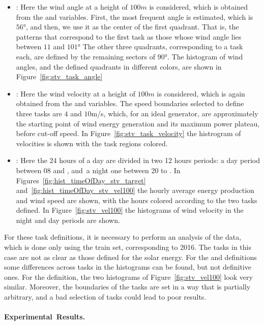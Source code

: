 \begin{itemize}
    \item {}: Here the wind angle at a height of $100m$ is considered, which is obtained from the  and  variables. 
    First, the most frequent angle is estimated, which is $\ang{56}$, and then, we use it as the center of the first quadrant. That is, the patterns that correspond to the first task as those whose wind angle lies between ${11}$ and $\ang{101}$  The other three quadrants, corresponding to a task each, are defined by the remaining sectors of $\ang{90}$.
    The histogram of wind angles, and the defined quadrants in different colors, are shown in Figure~\ref{fig:stv_task_angle}
    \item {}: Here the wind velocity at a height of $100m$ is considered, which is again obtained from the  and  variables. The speed boundaries selected to define three tasks are $4$ and $10$m/s, which, for an ideal generator, are approximately the starting point of wind energy generation and its maximum power plateau, before cut-off speed.   
    In Figure~\ref{fig:stv_task_velocity} the histrogram of velocities is shown with the task regions colored. 
    \item {}: Here the 24 hours of a day are divided in two 12 hours periods: a day period between 08 and , and~a night one between 20 to .
    In Figures~\ref{fig:hist_timeOfDay_stv_target} and~\ref{fig:hist_timeOfDay_stv_vel100} the hourly average energy production and wind speed are shown, with the hours colored according to the two tasks defined. In Figure~\ref{fig:stv_vel100} the histograms of wind velocity in the night and day periods are shown.
\end{itemize}
%
For these task definitions, it is necessary to perform an analysis of the data, which is done only using the train set, corresponding to 2016.
The tasks in this case are not as clear as those defined for the solar energy. For the  and  definitions some differences across tasks in the histograms can be found, but not definitive ones.
For the  definition, the two histograms of Figure~\ref{fig:stv_vel100} look very similar.
Moreover, the boundaries of the tasks are set in a way that is partially arbitrary, and a bad selection of tasks could lead to poor results.


\paragraph*{Experimental~Results.\\}


